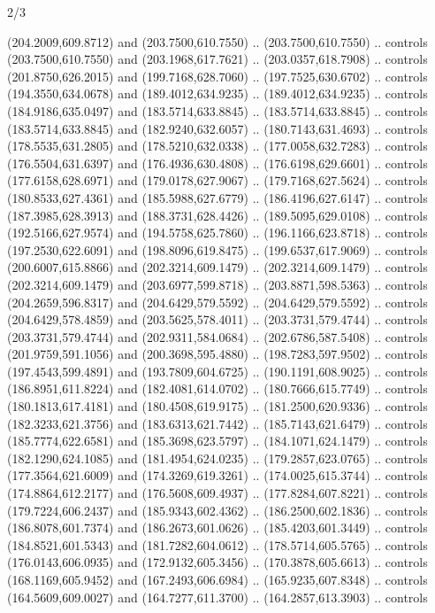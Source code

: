 \begin{flagdescription}{2/3}
\begin{scope}[shift={(0.5\flaglength,0.5)},scale=\flagwidth/545]
\begin{scope}[y=0.80pt, x=0.80pt, yscale=-1,shift={(-297,-430)}]
\begin{scope}[shift={(28.51887,-25.61095)}]
  (204.2009,609.8712) and (203.7500,610.7550) .. (203.7500,610.7550) .. controls
  (203.7500,610.7550) and (203.1968,617.7621) .. (203.0357,618.7908) .. controls
  (201.8750,626.2015) and (199.7168,628.7060) .. (197.7525,630.6702) .. controls
  (194.3550,634.0678) and (189.4012,634.9235) .. (189.4012,634.9235) .. controls
  (184.9186,635.0497) and (183.5714,633.8845) .. (183.5714,633.8845) .. controls
  (183.5714,633.8845) and (182.9240,632.6057) .. (180.7143,631.4693) .. controls
  (178.5535,631.2805) and (178.5210,632.0338) .. (177.0058,632.7283) .. controls
  (176.5504,631.6397) and (176.4936,630.4808) .. (176.6198,629.6601) .. controls
  (177.6158,628.6971) and (179.0178,627.9067) .. (179.7168,627.5624) .. controls
  (180.8533,627.4361) and (185.5988,627.6779) .. (186.4196,627.6147) .. controls
  (187.3985,628.3913) and (188.3731,628.4426) .. (189.5095,629.0108) .. controls
  (192.5166,627.9574) and (194.5758,625.7860) .. (196.1166,623.8718) .. controls
  (197.2530,622.6091) and (198.8096,619.8475) .. (199.6537,617.9069) .. controls
  (200.6007,615.8866) and (202.3214,609.1479) .. (202.3214,609.1479) .. controls
  (202.3214,609.1479) and (203.6977,599.8718) .. (203.8871,598.5363) .. controls
  (204.2659,596.8317) and (204.6429,579.5592) .. (204.6429,579.5592) .. controls
  (204.6429,578.4859) and (203.5625,578.4011) .. (203.3731,579.4744) .. controls
  (203.3731,579.4744) and (202.9311,584.0684) .. (202.6786,587.5408) .. controls
  (201.9759,591.1056) and (200.3698,595.4880) .. (198.7283,597.9502) .. controls
  (197.4543,599.4891) and (193.7809,604.6725) .. (190.1191,608.9025) .. controls
  (186.8951,611.8224) and (182.4081,614.0702) .. (180.7666,615.7749) .. controls
  (180.1813,617.4181) and (180.4508,619.9175) .. (181.2500,620.9336) .. controls
  (182.3233,621.3756) and (183.6313,621.7442) .. (185.7143,621.6479) .. controls
  (185.7774,622.6581) and (185.3698,623.5797) .. (184.1071,624.1479) .. controls
  (182.1290,624.1085) and (181.4954,624.0235) .. (179.2857,623.0765) .. controls
  (177.3564,621.6009) and (174.3269,619.3261) .. (174.0025,615.3744) .. controls
  (174.8864,612.2177) and (176.5608,609.4937) .. (177.8284,607.8221) .. controls
  (179.7224,606.2437) and (185.9343,602.4362) .. (186.2500,602.1836) .. controls
  (186.8078,601.7374) and (186.2673,601.0626) .. (185.4203,601.3449) .. controls
  (184.8521,601.5343) and (181.7282,604.0612) .. (178.5714,605.5765) .. controls
  (176.0143,606.0935) and (172.9132,605.3456) .. (170.3878,605.6613) .. controls
  (168.1169,605.9452) and (167.2493,606.6984) .. (165.9235,607.8348) .. controls
  (164.5609,609.0027) and (164.7277,611.3700) .. (164.2857,613.3903) .. controls

\end{scope}
\end{scope}
\end{scope}
\end{flagdescription}
